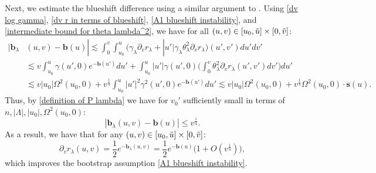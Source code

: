 \documentclass[11pt]{article}
\numberwithin{equation}{section}
\begin{document}
Next, we estimate the blueshift difference using a similar argument to . Using \eqref{dv log gamma}, \eqref{dv r in terms of blueshift}, \eqref{A1 blueshift instability}, and \eqref{intermediate bound for theta lambda^2}, we have for all $(u,v)\in[u_0,\Tilde{u}]\times[0,\Tilde{v}]$:
\begin{align*}
    |\mathbf{b}_{\lambda}&(u,v)-\mathbf{b}(u)|\lesssim\int_0^v\int_{u_0}^u\Big(\gamma_{\lambda}\partial_vr_{\lambda}+|u'|\gamma_{\lambda}\theta_{\lambda}^2\partial_vr_{\lambda}\Big)(u',v')du'dv'\\
    &\lesssim v\int_{u_0}^u\gamma(u',0)e^{-\mathbf{b}(u')}du'+\int_{u_0}^u|u'|\gamma(u',0)\bigg(\int_0^v\theta_{\lambda}^2\partial_vr_{\lambda}(u',v')dv'\bigg)du'\\
    &\lesssim v|u_0|\Omega^2(u_0,0)+v^{\frac{1}{3}}\int_{u_0}^u|u'|^2\gamma^2(u',0)e^{-\mathbf{b}(u')}du'\lesssim v|u_0|\Omega^2(u_0,0)+v^{\frac{1}{3}}\Omega^2(u_0,0)\cdot\mathbf{s}(u).
\end{align*}
Thus, by \eqref{definition of P lambda} we have for $v_0'$ sufficiently small in terms of $n,|\Lambda|,|u_0|,\Omega^2(u_0,0):$
\begin{equation}\label{blueshift difference bound}
    |\mathbf{b}_{\lambda}(u,v)-\mathbf{b}(u)|\leq v^{\frac{1}{4}}.
\end{equation}
As a result, we have that for any $(u,v)\in[u_0,\Tilde{u}]\times[0,\Tilde{v}]$:
\begin{equation}\label{dv r lambda in terms of b(u)}
    \partial_vr_{\lambda}(u,v)=\frac{1}{2}e^{-\mathbf{b}_{\lambda}(u,v)}=\frac{1}{2}e^{-\mathbf{b}(u)}\big(1+O(v^{\frac{1}{4}})\big),
\end{equation}
which improves the bootstrap assumption \eqref{A1 blueshift instability}.
\end{document}
